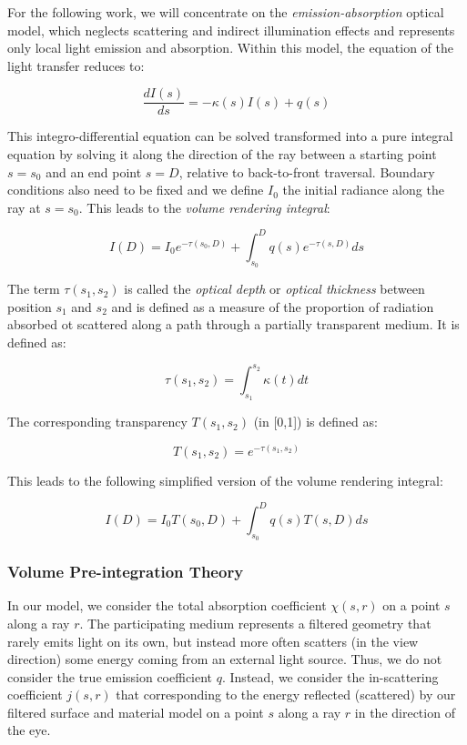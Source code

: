 For the following work, we will concentrate on the \textit{emission-absorption} optical model, which neglects scattering and indirect illumination effects and represents only local light emission and absorption. Within this model, the equation of the light transfer reduces to:

\begin{equation*}
	\frac{dI(s)}{ds}=-\kappa (s)I(s)+q(s)
\end{equation*}

This integro-differential equation can be solved transformed into a pure integral equation by solving it along the direction of the ray between a starting point $s=s_0$ and an end point $s=D$, relative to back-to-front traversal. Boundary conditions also need to be fixed and we define $I_0$ the initial radiance along the ray at $s=s_0$. This leads to the \textit{volume rendering integral}\cite{b:Real-timeVolumeGraphics}:

\begin{equation*}
	I(D)=I_0 e^{-\tau (s_0,D)}+\int^{D}_{s_0}q(s)e^{-\tau (s,D)}ds
\end{equation*}

The term $\tau(s_1,s_2)$ is called the \textit{optical depth} or \textit{optical thickness} between position $s_1$ and $s_2$ and is defined as a measure of the proportion of radiation absorbed ot scattered along a path through a partially transparent medium. It is defined as:

\begin{equation*}
	\tau(s_1,s_2)=\int^{s_2}_{s_1}\kappa(t)dt
\end{equation*}

The corresponding transparency $T(s_1,s_2)$ (in [0,1]) is defined as:

\begin{equation*}
	T(s_1,s_2)=e^{-\tau(s_1,s_2)}
\end{equation*}

This leads to the following simplified version of the volume rendering integral:

\begin{equation*}
	I(D)=I_0T(s_0,D)+\int^{D}_{s_0}q(s)T(s,D)ds
\end{equation*}




\subsubsection{Volume Pre-integration Theory}
In our model, we consider the total absorption coefficient $\chi(s,r)$ on a point $s$ along a ray $r$. The participating medium represents a filtered geometry that rarely emits light on its own, but instead more often scatters (in the view direction) some energy coming from an external light source. Thus, we do not consider the true emission coefficient $q$. Instead, we consider the in-scattering coefficient $j(s,r)$ that corresponding to the energy reflected (scattered) by our filtered surface and material model on a point $s$ along a ray $r$ in the direction of the eye.

